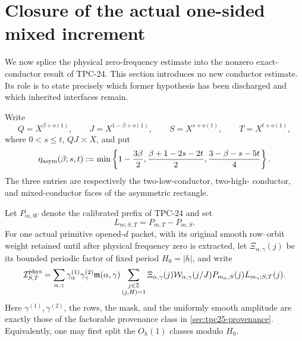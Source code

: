 \section{Closure of the actual one-sided mixed increment}
\label{sec:tpc25-one-sided-closure}

We now splice the physical zero-frequency estimate into the nonzero
exact-conductor result of TPC-24.  This section introduces no new
conductor estimate.  Its role is to state precisely which former
hypothesis has been discharged and which inherited interfaces remain.

Write
\begin{equation}
 Q=X^{\beta+o(1)},\qquad J=X^{1-\beta+o(1)},
 \qquad S=X^{s+o(1)},\qquad T=X^{t+o(1)},
 \label{eq:tpc25-closure-exponents}
\end{equation}
where \(0<s\le t\), \(QJ\asymp X\), and put
\begin{equation}
 \eta_{\rm asym}(\beta;s,t)
 :=\min\left\{
 1-\frac{3\beta}{2},
 \frac{\beta+1-2s-2t}{2},
 \frac{3-\beta-s-5t}{4}
 \right\}.
 \label{eq:tpc25-eta-asym}
\end{equation}
The three entries are respectively the two-low-conductor, two-high-
conductor, and mixed-conductor faces of the asymmetric rectangle.

Let \(P_{m,W}\) denote the calibrated prefix of TPC-24 and set
\[
 L_{m;S,T}=P_{m,T}-P_{m,S}.
\]
For one actual primitive opened-\(d\) packet, with its original smooth
row--orbit weight retained until after physical frequency zero is
extracted, let \(\Xi_{\alpha,\gamma}(j)\) be its bounded periodic
factor of fixed period \(H_0=|h|\), and write
\begin{equation}
 \mathcal I^{\rm phys}_{S,T}
 =\sum_{\alpha,\gamma}
 \gamma^{(1)}_\alpha\gamma^{(2)}_\gamma
 \mathfrak m(\alpha,\gamma)
 \sum_{\substack{j\in\mathbb Z\\(j,H)=1}}
 \Xi_{\alpha,\gamma}(j)\mathcal W_{\alpha,\gamma}(j/J)
 P_{m_\alpha,S}(j)L_{m_\gamma;S,T}(j).
 \label{eq:tpc25-physical-increment}
\end{equation}
Here \(\gamma^{(1)},\gamma^{(2)}\), the rows, the mask, and the
uniformly smooth amplitude are exactly those of the factorable
provenance class in \cref{sec:tpc25-provenance}.  Equivalently, one may
first split the \(O_h(1)\) classes modulo \(H_0\).

